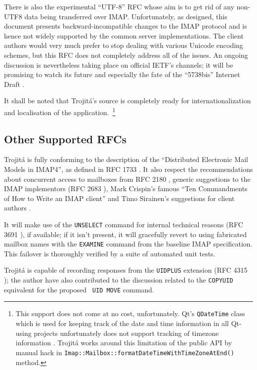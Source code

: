 \documentclass[trojita]{subfiles}
\begin{document}
There is also the experimental ``UTF-8'' RFC \cite{rfc5738} whose aim is to get rid of any non-UTF8 data being
transferred over IMAP.  Unfortunately, as designed, this document presents backward-incompatible changes to the IMAP
protocol and is hence not widely supported by the common server implementations.  The client authors would very much
prefer to stop dealing with various Unicode encoding schemes, but this RFC does not completely address all of the
issues.  An ongoing discussion is nevertheless taking place on official IETF's channels; it will be promising to watch
its future and especially the fate of the ``5738bis'' Internet Draft \cite{draft-ietf-eai-5738bis}.

It shall be noted that Trojitá's source is completely ready for internationalization and localisation of the
application.~\footnote{This support does not come at no cost, unfortunately.  Qt's {\tt QDateTime} class which is used
for keeping track of the date and time information in all Qt-using projects unfortunately does not support tracking of
timezone information \cite{qt-qdatetime-tz}.  Trojitá works around this limitation of the public API by manual hack in
{\tt Imap::Mailbox::formatDateTimeWithTimeZoneAtEnd()} method.}

\subsection{Other Supported RFCs}

Trojitá is fully conforming to the description of the ``Distributed Electronic Mail Models in IMAP4'', as defined in RFC
1733 \cite{rfc1733}.  It also respect the recommendations about concurrent access to mailboxes from RFC 2180
\cite{rfc2180}, generic suggestions to the IMAP implementors (RFC 2683 \cite{rfc2683}), Mark Crispin's famous ``Ten
Commandments of How to Write an IMAP client'' \cite{crispin-ten-commandments} and Timo Sirainen's suggestions for client
authors \cite{tss-client-coding-howto} \cite{imapwiki-client-best-practices}.

It will make use of the {\tt UNSELECT} command for internal technical reasons (RFC 3691 \cite{rfc3691}), if available;
if it isn't present, it will gracefully revert to using fabricated mailbox names with the {\tt EXAMINE} command from the
baseline IMAP specification.  This failover is thoroughly verified by a suite of automated unit tests.

Trojitá is capable of recording responses from the {\tt UIDPLUS} extension (RFC 4315 \cite{rfc4315}); the author have
also contributed \cite{jkt-move-uidplus} to the discussion related to the {\tt COPYUID} equivalent for the proposed {\tt
UID MOVE} command.
\end{document}
